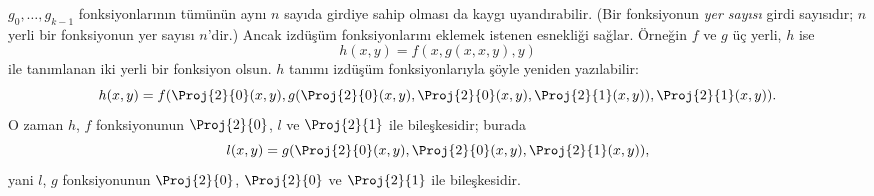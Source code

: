 $g_0,\dots,g_{k-1}$ fonksiyonlarının tümünün aynı $n$ sayıda girdiye
sahip olması da kaygı uyandırabilir. (Bir fonksiyonun \emph{yer sayısı}
girdi sayısıdır; $n$ yerli bir fonksiyonun yer sayısı $n$'dir.) Ancak
izdüşüm fonksiyonlarını eklemek istenen esnekliği sağlar. Örneğin $f$
ve $g$ üç yerli, $h$ ise
\[
h(x,y)=f(x,g(x,x,y),y)
\]
ile tanımlanan iki yerli bir fonksiyon olsun. $h$ tanımı izdüşüm
fonksiyonlarıyla şöyle yeniden yazılabilir:
\[
h(x,y) = f(\Proj{2}{0}(x,y), g(\Proj{2}{0}(x,y), \Proj{2}{0}(x,y),
\Proj{2}{1}(x,y)), \Proj{2}{1}(x,y)).
\]
O zaman $h$, $f$ fonksiyonunun $\Proj{2}{0}$, $l$ ve $\Proj{2}{1}$
ile bileşkesidir; burada
\[
l(x,y)=g(\Proj{2}{0}(x,y),\Proj{2}{0}(x,y),\Proj{2}{1}(x,y)),
\]
yani $l$, $g$ fonksiyonunun $\Proj{2}{0}$, $\Proj{2}{0}$ ve
$\Proj{2}{1}$ ile bileşkesidir.

